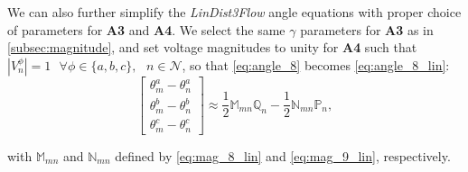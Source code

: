 We can also further simplify the \emph{LinDist3Flow} angle equations with proper choice of parameters for \textbf{A3} and \textbf{A4}. We select the same $\gamma$ parameters for \textbf{A3} as in \ref{subsec:magnitude}, and set voltage magnitudes to unity for \textbf{A4} such that $\left| V_{n}^{\phi} \right| = 1 \text{ } \forall \phi \in \{ a,b,c \}, \text{ } n \in \mathcal{N}$, so that \eqref{eq:angle_8} becomes \eqref{eq:angle_8_lin}:
\begin{equation}
    \begin{bmatrix}
    	\theta_{m}^{a} - \theta_{n}^{a} \\
        \theta_{m}^{b} - \theta_{n}^{b} \\
        \theta_{m}^{c} - \theta_{n}^{c}
    \end{bmatrix}
	\approx \frac{1}{2} \mathbb{M}_{mn} \mathbb{Q}_{n} - \frac{1}{2} \mathbb{N}_{mn} \mathbb{P}_{n},
    \label{eq:angle_8_lin}
\end{equation}

\noindent with $\mathbb{M}_{mn}$ and $\mathbb{N}_{mn}$ defined by \eqref{eq:mag_8_lin} and \eqref{eq:mag_9_lin}, respectively.

